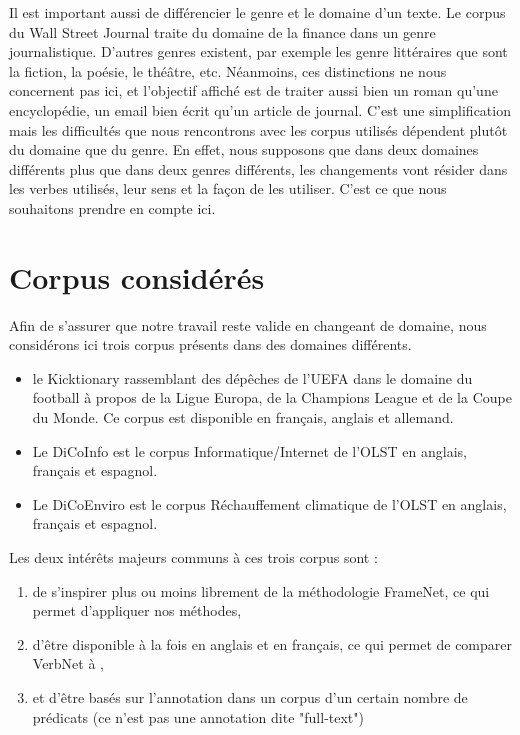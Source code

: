 Il est important aussi de différencier le genre et le domaine d'un texte. Le
corpus du Wall Street Journal traite du domaine de la finance dans un genre
journalistique. D'autres genres existent, par exemple les genre littéraires que
sont la fiction, la poésie, le théâtre, etc. Néanmoins, ces distinctions ne
nous concernent pas ici, et l'objectif affiché est de traiter aussi bien un
roman qu'une encyclopédie, un email bien écrit qu'un article de journal.  C'est
une simplification mais les difficultés que nous rencontrons avec les corpus
utilisés dépendent plutôt du domaine que du genre. En effet, nous supposons que
dans deux domaines différents plus que dans deux genres différents, les
changements vont résider dans les verbes utilisés, leur sens et la façon de les
utiliser. C'est ce que nous souhaitons prendre en compte ici.

\section{Corpus considérés}

Afin de s'assurer que notre travail reste valide en changeant de domaine, nous
considérons ici trois corpus présents dans des domaines différents.

\begin{itemize}

    \item le Kicktionary \citep{schmidt2006interfacing,schmidt2009kicktionary}
        rassemblant des dépêches de l'UEFA dans le domaine du football à propos
        de la Ligue Europa, de la Champions League et de la Coupe du Monde. Ce
        corpus est disponible en français, anglais et allemand.

    \item Le DiCoInfo est le corpus Informatique/Internet de l'OLST
        \citep{corpusolst} en anglais, français et espagnol.

    \item Le DiCoEnviro est le corpus Réchauffement climatique de l'OLST
        \citep{corpusolst} en anglais, français et espagnol.

\end{itemize}

Les deux intérêts majeurs communs à ces trois corpus sont :

\begin{enumerate}

    \item de s'inspirer plus ou moins librement de la méthodologie FrameNet, ce
        qui permet d'appliquer nos méthodes,

    \item d'être disponible à la fois en anglais et en français, ce qui permet
        de comparer VerbNet à \verbenet{},

    \item et d'être basés sur l'annotation dans un corpus d'un certain nombre
        de prédicats (ce n'est pas une annotation dite "full-text")

\end{enumerate}

